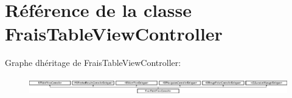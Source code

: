 \hypertarget{interface_frais_table_view_controller}{}\section{Référence de la classe Frais\+Table\+View\+Controller}
\label{interface_frais_table_view_controller}
Graphe d\textquotesingle{}héritage de Frais\+Table\+View\+Controller\+:\begin{figure}[H]
\begin{center}
\leavevmode
\includegraphics[height=0.768176cm]{interface_frais_table_view_controller}
\end{center}
\end{figure}
